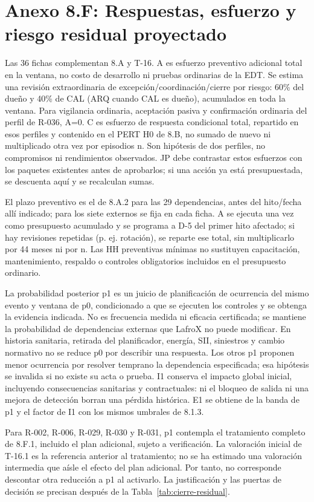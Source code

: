 \clearpage
\section{Anexo 8.F: Respuestas, esfuerzo y riesgo residual proyectado}
\label{sec:cierre-respuestas}
Las 36 fichas complementan 8.A y T-16. A es esfuerzo preventivo adicional total en la ventana, no costo de desarrollo ni pruebas ordinarias de la EDT. Se estima una revisión extraordinaria de excepción/coordinación/cierre por riesgo: 60\% del dueño y 40\% de CAL (ARQ cuando CAL es dueño), acumulados en toda la ventana. Para vigilancia ordinaria, aceptación pasiva y confirmación ordinaria del perfil de R-036, A=0. C es esfuerzo de respuesta condicional total, repartido en esos perfiles y contenido en el PERT H0 de 8.B, no sumado de nuevo ni multiplicado otra vez por episodios n. Son hipótesis de dos perfiles, no compromisos ni rendimientos observados. JP debe contrastar estos esfuerzos con los paquetes existentes antes de aprobarlos; si una acción ya está presupuestada, se descuenta aquí y se recalculan sumas.

El plazo preventivo es el de 8.A.2 para las 29 dependencias, antes del hito/fecha allí indicado; para los siete externos se fija en cada ficha. A se ejecuta una vez como presupuesto acumulado y se programa a D-5 del primer hito afectado; si hay revisiones repetidas (p. ej. rotación), se reparte ese total, sin multiplicarlo por 44 meses ni por n. Las HH preventivas mínimas no sustituyen capacitación, mantenimiento, respaldo o controles obligatorios incluidos en el presupuesto ordinario.

La probabilidad posterior p1 es un juicio de planificación de ocurrencia del mismo evento y ventana de p0, condicionado a que se ejecuten los controles y se obtenga la evidencia indicada. No es frecuencia medida ni eficacia certificada; se mantiene la probabilidad de dependencias externas que LafroX no puede modificar. En historia sanitaria, retirada del planificador, energía, SII, siniestros y cambio normativo no se reduce p0 por describir una respuesta. Los otros p1 proponen menor ocurrencia por resolver temprano la dependencia especificada; esa hipótesis se invalida si no existe su acta o prueba. I1 conserva el impacto global inicial, incluyendo consecuencias sanitarias y contractuales: ni el bloqueo de salida ni una mejora de detección borran una pérdida histórica. E1 se obtiene de la banda de p1 y el factor de I1 con los mismos umbrales de 8.1.3.

Para R-002, R-006, R-029, R-030 y R-031, p1 contempla el tratamiento completo de 8.F.1, incluido el plan adicional, sujeto a verificación. La valoración inicial de T-16.1 es la referencia anterior al tratamiento; no se ha estimado una valoración intermedia que aísle el efecto del plan adicional. Por tanto, no corresponde descontar otra reducción a p1 al activarlo. La justificación y las puertas de decisión se precisan después de la Tabla~\ref{tab:cierre-residual}.

